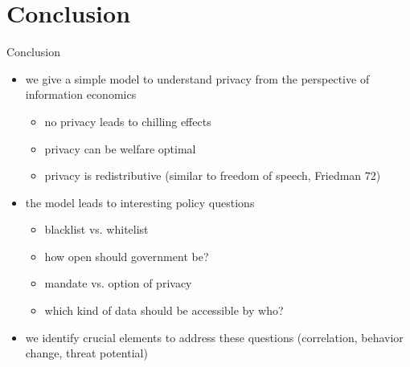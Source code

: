 \documentclass[bigger]{beamer}
\begin{document}
\section{Conclusion}
\label{sec:orgheadline24}
\begin{frame}[label={sec:orgheadline23}]{Conclusion}
\begin{itemize}
\item we give a simple model to understand privacy from the perspective of information economics
\begin{itemize}
\item no privacy leads to chilling effects
\item privacy can be welfare optimal
\item privacy is redistributive (similar to freedom of speech, Friedman 72)
\end{itemize}
\item the model leads to interesting policy questions
\begin{itemize}
\item blacklist vs. whitelist
\item how open should government be?
\item mandate vs. option of privacy
\item which kind of data should be accessible by who?
\end{itemize}
\item we identify crucial elements to address these questions (correlation, behavior change, threat potential)
\end{itemize}
\end{frame}
\end{document}
